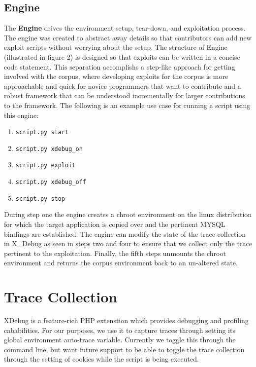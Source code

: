 \documentclass[letterpaper,twocolumn,10pt]{article}
\begin{document}
\subsection{Engine}
The {\bf Engine} drives the environment setup, tear-down, and exploitation process.  The engine was created to abstract away details so that contributors can add new exploit scripts without worrying about the setup. The structure of Engine (illustrated in figure 2) is designed so that exploits can be written in a concise code statement.  This separation accomplishs a step-like approach for getting involved with the corpus, where developing exploits for the corpus is more approachable and quick for novice programmers that want to contribute and a robust framework that can be understood incrementally for larger contributions to the framework.  The following is an  example use case for running a script using this engine:
 

\begin{enumerate}
	\item {\tt script.py start}
	\item {\tt script.py xdebug\_on}
	\item {\tt script.py exploit}
	\item {\tt script.py xdebug\_off}
	\item {\tt script.py stop}
\end{enumerate}

During step one the engine creates a chroot environment on the linux distribution for which the target application is copied over and the pertinent MYSQL bindings are established.  The engine can modify the state of the trace collection in X\_Debug as seen in steps two and four to ensure that we collect only the trace pertinent to the exploitation.  Finally, the fifth steps unmounts the chroot environment and returns the corpus environment back to an un-altered state.


\section{Trace Collection}

XDebug is a feature-rich PHP extenstion which provides debugging and profiling cababilities.  For our purposes, we use it to capture traces through setting its global environment auto-trace variable.  Currently we toggle this through the command line, but want future support to be able to toggle the trace collection through the setting of cookies while the script is being executed.
\end{document}
